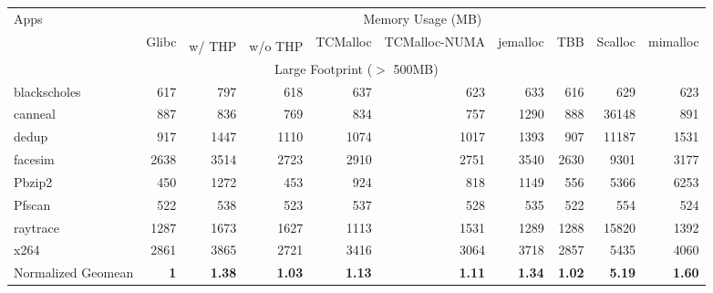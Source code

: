 \begin{table*}[tp]
\footnotesize
  \centering
    \begin{tabular}{|l|r|rr|rrrrrr|}
    \hline
    \multirow{3}{*}{Apps}&
    \multicolumn{9}{c|}{Memory Usage (MB)}\\
    \cline{2-10}
    &\multirow{2}{*}{Glibc}&\multicolumn{2}{c|}{\NM{}}&\multirow{2}{*}{TCMalloc}&\multirow{2}{*}{TCMalloc-NUMA}&\multirow{2}{*}{jemalloc}&\multirow{2}{*}{TBB}&\multirow{2}{*}{Scalloc}&\multirow{2}{*}{mimalloc} \\ \cline{3-4} 
    && w/ THP & w/o THP &&&&&& \\ \hline
    \hline
    \multicolumn{10}{|c|}{Large Footprint ($>$ 500MB)}\\ \hline
blackscholes&617&797&618&637&623&633&616&629&623\\ \hline
canneal&887&836&769&834&757&1290&888&36148&891\\ \hline
dedup&917&1447&1110&1074&1017&1393&907&11187&1531\\ \hline
facesim&2638&3514&2723&2910&2751&3540&2630&9301&3177\\ \hline
Pbzip2&450&1272&453&924&818&1149&556&5366&6253\\ \hline
Pfscan&522&538&523&537&528&535&522&554&524\\ \hline
raytrace&1287&1673&1627&1113&1531&1289&1288&15820&1392\\ \hline
x264&2861&3865&2721&3416&3064&3718&2857&5435&4060\\ \hline
\hline
Normalized Geomean &{\bf 1}&{\bf 1.38}&{\bf 1.03}&{\bf 1.13}&{\bf 1.11}&{\bf 1.34}&{\bf 1.02}&{\bf 5.19}&{\bf 1.60}\\ \hline


\end{tabular}
\end{table*}
